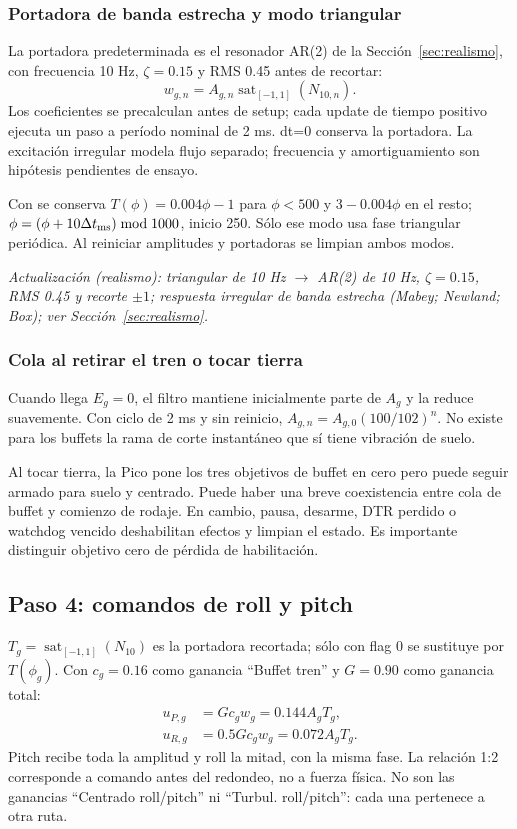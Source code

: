 \documentclass[11pt,a4paper]{article}
\newcommand{\code}[1]{\texttt{\detokenize{#1}}}
\newcommand{\sat}{\operatorname{sat}}
\begin{document}
\subsubsection{Portadora de banda estrecha y modo triangular}
La portadora predeterminada es el resonador AR(2) de la Sección~\ref{sec:realismo}, con frecuencia 10 Hz, $\zeta=0.15$ y RMS 0.45 antes de recortar:
\begin{equation}w_{g,n}=A_{g,n}\sat_{[-1,1]}(N_{10,n}).\end{equation}
Los coeficientes se precalculan antes de setup; cada update de tiempo positivo ejecuta un paso a período nominal de 2 ms. dt=0 conserva la portadora. La excitación irregular modela flujo separado; frecuencia y amortiguamiento son hipótesis pendientes de ensayo.

Con \code{SIMCONNECT_BUFFET_NARROWBAND=0} se conserva $T(\phi)=0.004\phi-1$ para $\phi<500$ y $3-0.004\phi$ en el resto; $\phi=(\phi+10\Delta t_{\rm ms})\bmod1000$, inicio 250. Sólo ese modo usa fase triangular periódica. Al reiniciar amplitudes y portadoras se limpian ambos modos.

\textit{Actualización (realismo): triangular de 10 Hz $\rightarrow$ AR(2) de 10 Hz, $\zeta=0.15$, RMS 0.45 y recorte $\pm1$; respuesta irregular de banda estrecha (Mabey; Newland; Box); ver Sección~\ref{sec:realismo}.}

\subsubsection{Cola al retirar el tren o tocar tierra}
Cuando llega $E_g=0$, el filtro mantiene inicialmente parte de $A_g$ y la reduce suavemente. Con ciclo de 2 ms y sin reinicio, $A_{g,n}=A_{g,0}(100/102)^n$. No existe para los buffets la rama de corte instantáneo que sí tiene vibración de suelo.

Al tocar tierra, la Pico pone los tres objetivos de buffet en cero pero puede seguir armado para suelo y centrado. Puede haber una breve coexistencia entre cola de buffet y comienzo de rodaje. En cambio, pausa, desarme, DTR perdido o watchdog vencido deshabilitan efectos y limpian el estado. Es importante distinguir objetivo cero de pérdida de habilitación.

\subsection{Paso 4: comandos de roll y pitch}
$T_g=\sat_{[-1,1]}(N_{10})$ es la portadora recortada; sólo con flag 0 se sustituye por $T(\phi_g)$.
Con $c_g=0.16$ como ganancia ``Buffet tren'' y $G=0.90$ como ganancia total:
\begin{align}
u_{P,g}&=G c_g w_g=0.144 A_gT_g,\\
u_{R,g}&=0.5G c_g w_g=0.072 A_gT_g.
\end{align}
Pitch recibe toda la amplitud y roll la mitad, con la misma fase. La relación 1:2 corresponde a comando antes del redondeo, no a fuerza física. No son las ganancias ``Centrado roll/pitch'' ni ``Turbul. roll/pitch'': cada una pertenece a otra ruta.
\end{document}
